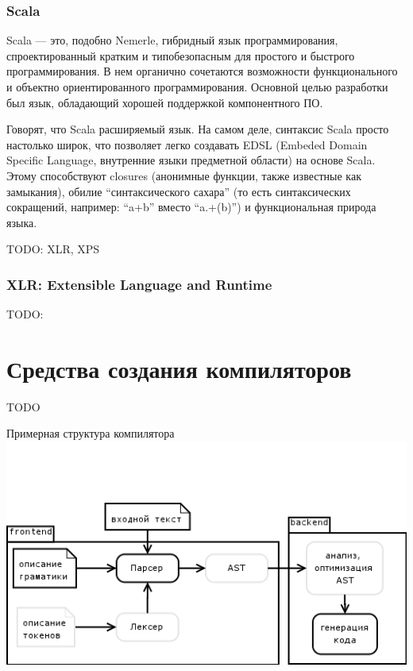 \documentclass[a4paper,12pt]{article}
\begin{document}
\subsubsection{Scala}
Scala — это, подобно Nemerle, гибридный язык программирования, спроектированный
кратким и типобезопасным для простого и быстрого программирования. В нем органично
сочетаются возможности функционального и объектно ориентированного
программирования. Основной целью разработки был язык, обладающий хорошей
поддержкой компонентного ПО.

Говорят, что Scala расширяемый язык. На самом деле, синтаксис Scala просто
настолько широк, что позволяет легко создавать EDSL (Embeded Domain Specific
Language, внутренние языки предметной области) на основе Scala. Этому
способствуют closures (анонимные функции, также известные как замыкания), обилие
``синтаксического сахара'' (то есть синтаксических сокращений, например:
``a+b'' вместо ``a.+(b)'') и функциональная природа языка.

TODO: XLR, XPS

\subsubsection{XLR: Extensible Language and Runtime}
TODO:

\section{Средства создания компиляторов}


TODO
\begin{center}
 Примерная структура компилятора
 \includegraphics[scale=0.6]{img/compiler.png}
\end{center}
\end{document}
